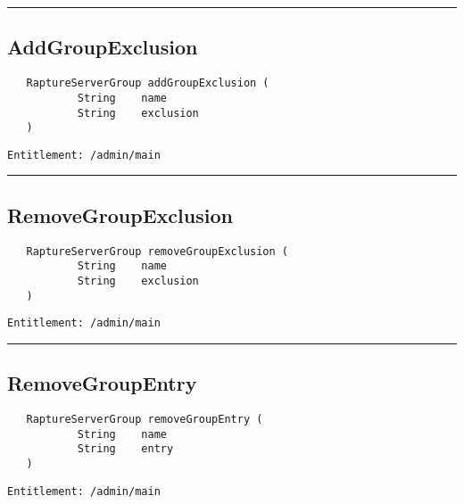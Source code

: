 \rule{12cm}{2pt}
\subsection{AddGroupExclusion}
\label{Api:AddGroupExclusion}
\begin{Verbatim}
   RaptureServerGroup addGroupExclusion (
           String    name
           String    exclusion
   )
\end{Verbatim}
\begin{Verbatim}[formatcom=\color{Maroon}]
  Entitlement: /admin/main
\end{Verbatim}



\rule{12cm}{2pt}
\subsection{RemoveGroupExclusion}
\label{Api:RemoveGroupExclusion}
\begin{Verbatim}
   RaptureServerGroup removeGroupExclusion (
           String    name
           String    exclusion
   )
\end{Verbatim}
\begin{Verbatim}[formatcom=\color{Maroon}]
  Entitlement: /admin/main
\end{Verbatim}



\rule{12cm}{2pt}
\subsection{RemoveGroupEntry}
\label{Api:RemoveGroupEntry}
\begin{Verbatim}
   RaptureServerGroup removeGroupEntry (
           String    name
           String    entry
   )
\end{Verbatim}
\begin{Verbatim}[formatcom=\color{Maroon}]
  Entitlement: /admin/main
\end{Verbatim}



